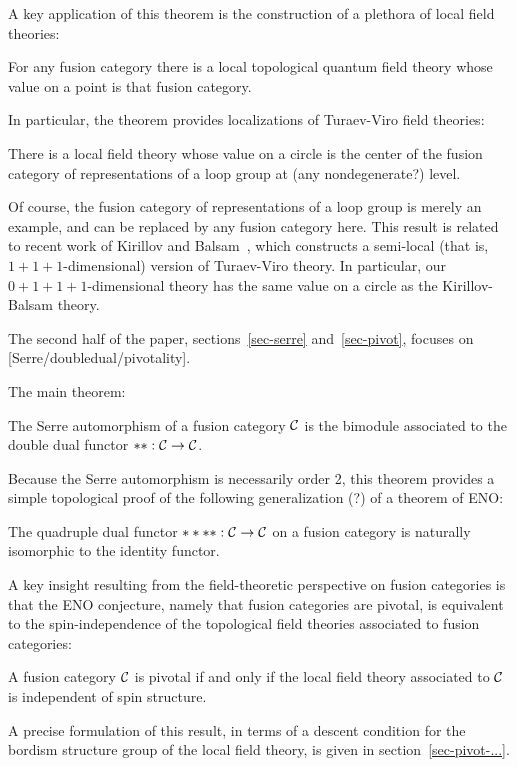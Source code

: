 \documentclass{amsart}
\begin{document}
A key application of this theorem is the construction of a plethora of local field theories:
\begin{corollary}
For any fusion category there is a local topological quantum field theory whose value on a point is that fusion category.
\end{corollary}

In particular, the theorem provides localizations of Turaev-Viro field theories:
\begin{corollary}
There is a local field theory whose value on a circle is the center of the fusion category of representations of a loop group at (any nondegenerate?) level.
\end{corollary}
Of course, the fusion category of representations of a loop group is merely an example, and can be replaced by any fusion category here.  This result is related to recent work of Kirillov and Balsam~\cite{kirillovbalsam}, which constructs a semi-local (that is, $1+1+1$-dimensional) version of Turaev-Viro theory.  In particular, our $0+1+1+1$-dimensional theory has the same value on a circle as the Kirillov-Balsam theory.  


The second half of the paper, sections~\ref{sec-serre} and~\ref{sec-pivot}, focuses on [Serre/doubledual/pivotality].

The main theorem:
\begin{theorem}
The Serre automorphism of a fusion category $\mathcal C$ is the bimodule associated to the double dual functor $**: \mathcal C \rightarrow \mathcal C$.
\end{theorem}

Because the Serre automorphism is necessarily order 2, this theorem provides a simple topological proof of the following generalization (?) of a theorem of ENO:
\begin{corollary}
The quadruple dual functor $****: \mathcal C \rightarrow \mathcal C$ on a fusion category is naturally isomorphic to the identity functor.
\end{corollary}

A key insight resulting from the field-theoretic perspective on fusion categories is that the ENO conjecture, namely that fusion categories are pivotal, is equivalent to the spin-independence of the topological field theories associated to fusion categories:
\begin{theorem}
A fusion category $\mathcal C$ is pivotal if and only if the local field theory associated to $\mathcal C$ is independent of spin structure.
\end{theorem}
A precise formulation of this result, in terms of a descent condition for the bordism structure group of the local field theory, is given in section~\ref{sec-pivot-...}.
\end{document}
